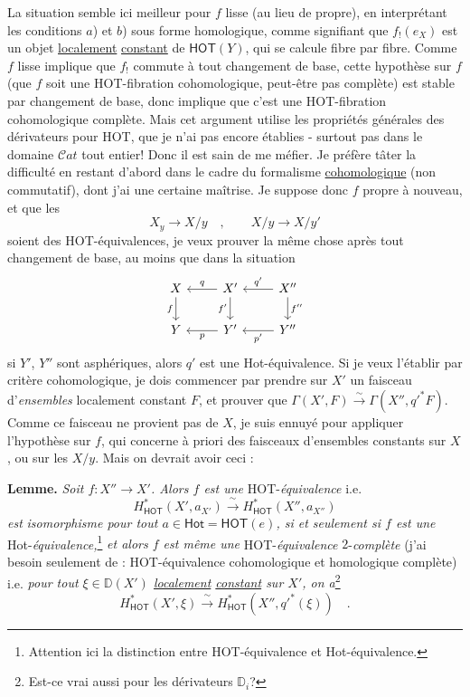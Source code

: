 \documentclass[11pt]{article}
\newcommand{\printedpage}[1]{\marginpar{\footnotesize p.~#1}}
\newcommand{\msp}[1]{\marginpar{\footnotesize [#1]}}
\newcommand{\HOT}{\textsf{HOT}}
\newcommand{\Hot}{\textsf{Hot}}
\newcommand{\Cat}{\mathcal{C}at}
\newcommand{\DD}{\mathbb{D}}
\begin{document}
La situation semble ici meilleur pour $f$ lisse (au lieu de propre), en interprétant les conditions $a$) et $b$) sous forme homologique, comme signifiant que $f_!(e_X)$ est un objet \underline{localement} \underline{constant} de $\mathsf{HOT}(Y)$, qui se calcule fibre par fibre. Comme $f$ lisse implique que $f_!$ commute à tout changement de base, cette hypothèse sur $f$ (que $f$ soit une \HOT-fibration cohomologique, peut-être pas complète) est stable par changement de base, donc implique que c'est une \HOT-fibration cohomologique complète. Mais cet argument utilise les propriétés générales des dérivateurs pour \HOT, que je n'ai pas encore établies - surtout pas dans le domaine $\Cat$ tout entier! Donc il est sain de me méfier. Je préfère tâter la difficulté en restant d'abord dans le cadre du formalisme \underline{cohomologique} (non commutatif), dont j'ai une certaine maîtrise. Je suppose donc $f$ propre à nouveau, et que les %
\[ X_y \longrightarrow X/y \quad , \qquad X/y \longrightarrow X/y' \]
\msp{page 109}
soient des \HOT-équivalences, je veux prouver la même chose après tout changement de base, au moins que dans la situation
\[
\begin{tikzcd}
X \arrow[r, leftarrow, "q"] \arrow[d, "f"'] & X' \arrow[r, leftarrow, "q'"] \arrow[d, "f'"'] & X'' \arrow[d, "f''"] \\
Y \arrow[r, leftarrow, "p"'] & Y' \arrow[r, leftarrow, "p'"'] & Y''
\end{tikzcd}
\]
\printedpage{65}
si $Y'$, $Y''$ sont asphériques, alors $q'$ est une \Hot-équivalence. Si je veux l'établir par critère cohomologique, je dois commencer par prendre sur $X'$ un faisceau d'\textit{ensembles} localement constant $F$, et prouver que $\Gamma(X',F) \overset{\sim}{\to} \Gamma(X'',{q'}^{*}F)$. Comme ce faisceau ne provient pas de $X$, je suis ennuyé pour appliquer l'hypothèse sur $f$, qui concerne à priori des faisceaux d'ensembles constants sur $X$, ou sur les $X/y$. Mais on devrait avoir ceci :

\textbf{Lemme.} \textit{Soit $f : X'' \to X'$. Alors $f$ est une} \HOT-\textit{équivalence} i.e.
\[ H^{*}_{\mathsf{HOT}}(X', a_{X'}) \xrightarrow{\ \sim\ } H^{*}_{\mathsf{HOT}}(X'', a_{X''}) \]
\textit{est} \textit{isomorphisme pour tout $a \in \mathsf{Hot} = \mathsf{HOT}(e)$, si et seulement si $f$ est une} \Hot-\textit{équivalence,}\footnote[56]{Attention ici la distinction entre \HOT-équivalence et \Hot-équivalence.} \textit{et alors $f$ est même une} \HOT-\textit{équivalence} $2$-\textit{complète} (j'ai besoin seulement de : \HOT-équivalence cohomologique et homologique complète) i.e. \textit{pour tout $\xi \in \DD(X')$ \underline{localement} \underline{constant} sur $X'$, on a}\footnote[57]{Est-ce vrai aussi pour les dérivateurs $\DD_i$?}
\[ H^{*}_{\mathsf{HOT}}(X',\xi) \xrightarrow{\ \sim\ } H^{*}_{\mathsf{HOT}}(X'',{q'}^{*}(\xi)) \quad . \]
\msp{page 110}
\end{document}
